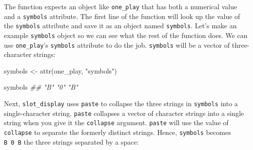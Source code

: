 \documentclass[
  letterpaper,
  DIV=11,
  numbers=noendperiod]{scrbook}
\newenvironment{Shaded}{\begin{snugshade}}{\end{snugshade}}
\newcommand{\AttributeTok}[1]{\textcolor[rgb]{0.40,0.45,0.13}{#1}}
\newcommand{\CommentTok}[1]{\textcolor[rgb]{0.37,0.37,0.37}{#1}}
\newcommand{\ControlFlowTok}[1]{\textcolor[rgb]{0.00,0.23,0.31}{\textbf{#1}}}
\newcommand{\DocumentationTok}[1]{\textcolor[rgb]{0.37,0.37,0.37}{\textit{#1}}}
\newcommand{\FunctionTok}[1]{\textcolor[rgb]{0.28,0.35,0.67}{#1}}
\newcommand{\NormalTok}[1]{\textcolor[rgb]{0.00,0.23,0.31}{#1}}
\newcommand{\OtherTok}[1]{\textcolor[rgb]{0.00,0.23,0.31}{#1}}
\newcommand{\SpecialCharTok}[1]{\textcolor[rgb]{0.37,0.37,0.37}{#1}}
\newcommand{\StringTok}[1]{\textcolor[rgb]{0.13,0.47,0.30}{#1}}
\begin{document}
\begin{Shaded}
\end{Shaded}

The function expects an object like \texttt{one\_play} that has both a
numerical value and a \texttt{symbols} attribute. The first line of the
function will look up the value of the \texttt{symbols} attribute and
save it as an object named \texttt{symbols}. Let's make an example
\texttt{symbols} object so we can see what the rest of the function
does. We can use \texttt{one\_play}'s \texttt{symbols} attribute to do
the job. \texttt{symbols} will be a vector of three-character strings:

\begin{Shaded}
\begin{Highlighting}[]
\NormalTok{symbols }\OtherTok{\textless{}{-}} \FunctionTok{attr}\NormalTok{(one\_play, }\StringTok{"symbols"}\NormalTok{)}

\NormalTok{symbols}
\DocumentationTok{\#\# "B" "0" "B"}
\end{Highlighting}
\end{Shaded}

Next, \texttt{slot\_display} uses \texttt{paste} to collapse the three
strings in \texttt{symbols} into a single-character string.
\texttt{paste} collapses a vector of character strings into a single
string when you give it the \texttt{collapse} argument. \texttt{paste}
will use the value of \texttt{collapse} to separate the formerly
distinct strings. Hence, \texttt{symbols} becomes \texttt{B\ 0\ B} the
three strings separated by a space:
\end{document}
